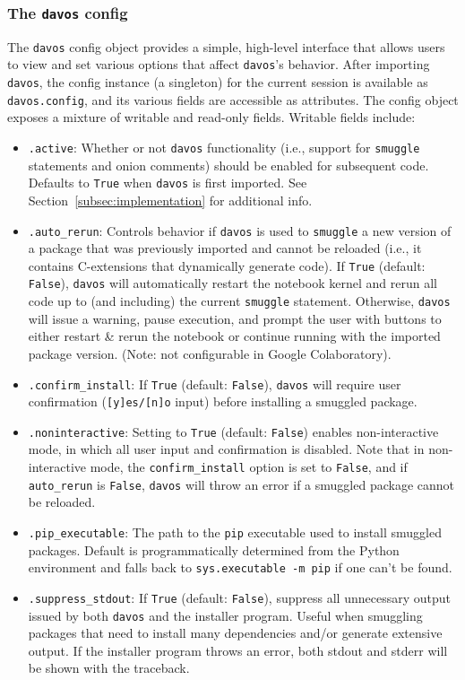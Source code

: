 \documentclass[preprint,12pt,a4paper]{elsarticle}
\begin{document}
\subsubsection{The \texttt{davos} config}\label{subsec:config}
The \texttt{davos} config object provides a simple, high-level interface that allows users to view and set various options that affect \texttt{davos}'s behavior. After importing \texttt{davos}, the config instance (a singleton) for the current session is available as \texttt{davos.config}, and its various fields are accessible as attributes. The config object exposes a mixture of writable and read-only fields. Writable fields include:
\begin{itemize}
\item \texttt{.active}: Whether or not \texttt{davos} functionality (i.e., support for \texttt{smuggle} statements and onion comments) should be enabled for subsequent code. Defaults to \texttt{True} when \texttt{davos} is first imported. See Section~\ref{subsec:implementation} for additional info.
\item \texttt{.auto\_rerun}: Controls behavior if \texttt{davos} is used to \texttt{smuggle} a new version of a package that was previously imported and cannot be reloaded (i.e., it contains C-extensions that dynamically generate code). If \texttt{True} (default: \texttt{False}), \texttt{davos} will automatically restart the notebook kernel and rerun all code up to (and including) the current \texttt{smuggle} statement. Otherwise, \texttt{davos} will issue a warning, pause execution, and prompt the user with buttons to either restart \& rerun the notebook or continue running with the imported package version. (Note: not configurable in Google Colaboratory).
\item \texttt{.confirm\_install}: If \texttt{True} (default: \texttt{False}), \texttt{davos} will require user confirmation (\texttt{[y]es/[n]o} input) before installing a smuggled package.
\item \texttt{.noninteractive}: Setting to \texttt{True} (default: \texttt{False}) enables non-interactive mode, in which all user input and confirmation is disabled. Note that in non-interactive mode, the \texttt{confirm\_install} option is set to \texttt{False}, and if \texttt{auto\_rerun} is \texttt{False}, \texttt{davos} will throw an error if a smuggled package cannot be reloaded.
\item \texttt{.pip\_executable}: The path to the \texttt{pip} executable used to install smuggled packages. Default is programmatically determined from the Python environment and falls back to \texttt{sys.executable -m pip} if one can't be found.
\item \texttt{.suppress\_stdout}: If \texttt{True} (default: \texttt{False}), suppress all unnecessary output issued by both \texttt{davos} and the installer program. Useful when smuggling packages that need to install many dependencies and/or generate extensive output. If the installer program throws an error, both stdout and stderr will be shown with the traceback.
\end{itemize}
\end{document}
